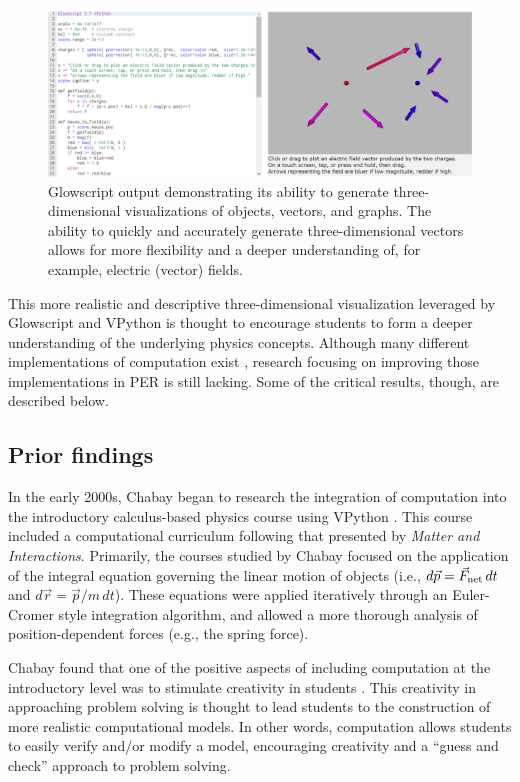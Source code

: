 \documentclass{msuphddissertation}
\begin{document}
\begin{doublespace}
\begin{figure}\center
\includegraphics[scale=0.35]{images/CH2Glowscript.pdf}
\caption{Glowscript output demonstrating its ability to generate three-dimensional visualizations of objects, vectors, and graphs.  The ability to quickly and accurately generate three-dimensional vectors allows for more flexibility and a deeper understanding of, for example, electric (vector) fields.}\label{CH2:Glowscript}
\end{figure}

This more realistic and descriptive three-dimensional visualization leveraged by Glowscript and VPython is thought to encourage students to form a deeper understanding of the underlying physics concepts.  Although many different implementations of computation exist \cite{Papert1972,DiSessa1986,Perkins2006,Chabay2008}, research focusing on improving those implementations in PER is still lacking.  Some of the critical results, though, are described below.

\subsection{Prior findings}

In the early 2000s, Chabay began to research the integration of computation into the introductory calculus-based physics course using VPython \cite{Chabay2008}.  This course included a computational curriculum following that presented by \textit{Matter and Interactions}.  Primarily, the courses studied by Chabay focused on the application of the integral equation governing the linear motion of objects (i.e., $d\vec{p}=\vec{F}_{\rm net}\,dt$ and $d\vec{r}=\vec{p}/m\,dt$).  These equations were applied iteratively through an Euler-Cromer style integration algorithm, and allowed a more thorough analysis of position-dependent forces (e.g., the spring force).

Chabay found that one of the positive aspects of including computation at the introductory level was to stimulate creativity in students \cite{Chabay2008}.  This creativity in approaching problem solving is thought to lead students to the construction of more realistic computational models.  In other words, computation allows students to easily verify and/or modify a model, encouraging creativity and a ``guess and check'' approach to problem solving.


\end{doublespace}
\end{document}
